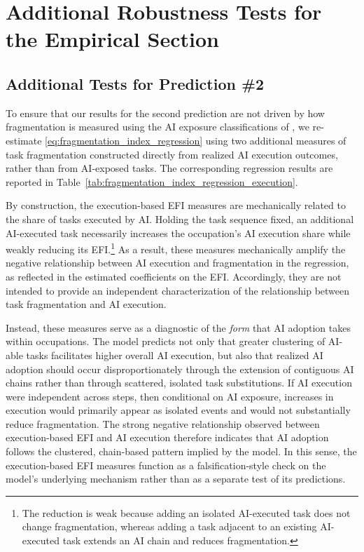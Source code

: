 \section{Additional Robustness Tests for the Empirical Section}
\label{app:additional_robustness}


\renewcommand{\thetable}{G.\arabic{table}}
\renewcommand{\thefigure}{G.\arabic{figure}}
\setcounter{table}{0}
\setcounter{figure}{0}


\subsection{Additional Tests for Prediction \#2}
\label{app:additional_robustness_pred2}
To ensure that our results for the second prediction are not driven by how fragmentation is measured using the AI exposure classifications of \citet{eloundou2023gpts}, we re-estimate \eqref{eq:fragmentation_index_regression} using two additional measures of task fragmentation constructed directly from realized AI execution outcomes, rather than from AI-exposed tasks.  
The corresponding regression results are reported in Table~\ref{tab:fragmentation_index_regression_execution}.

By construction, the execution-based EFI measures are mechanically related to the share of tasks executed by AI.  
Holding the task sequence fixed, an additional AI-executed task necessarily increases the occupation's AI execution share while weakly reducing its EFI.\footnote{The reduction is weak because adding an isolated AI-executed task does not change fragmentation, whereas adding a task adjacent to an existing AI-executed task extends an AI chain and reduces fragmentation.
}
As a result, these measures mechanically amplify the negative relationship between AI execution and fragmentation in the regression, as reflected in the estimated coefficients on the EFI.
Accordingly, they are not intended to provide an independent characterization of the relationship between task fragmentation and AI execution.  

Instead, these measures serve as a diagnostic of the \emph{form} that AI adoption takes within occupations.  
The model predicts not only that greater clustering of AI-able tasks facilitates higher overall AI execution, but also that realized AI adoption should occur disproportionately through the extension of contiguous AI chains rather than through scattered, isolated task substitutions.  
If AI execution were independent across steps, then conditional on AI exposure, increases in execution would primarily appear as isolated events and would not substantially reduce fragmentation.  
The strong negative relationship observed between execution-based EFI and AI execution therefore indicates that AI adoption follows the clustered, chain-based pattern implied by the model.
In this sense, the execution-based EFI measures function as a falsification-style check on the model's underlying mechanism rather than as a separate test of its predictions.  



